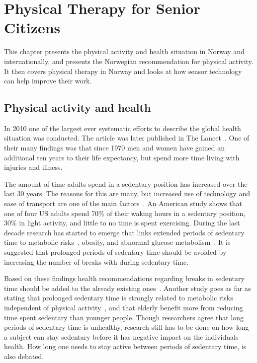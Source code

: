 \chapter{Physical Therapy for Senior Citizens}
This chapter presents the physical activity and health situation in Norway and internationally, and presents the Norwegian recommendation for physical activity. It then covers physical therapy in Norway and looks at how sensor technology can help improve their work.

\section{Physical activity and health}
In 2010 one of the largest ever systematic efforts to describe the global health situation was conducted. The article was later published in The Lancet~\cite{globalBurden}. One of their many findings was that since 1970 men and women have gained an additional ten years to their life expectancy, but spend more time living with injuries and illness. 

The amount of time adults spend in a sedentary position has increased over the last 30 years. The reasons for this are many, but increased use of technology and ease of transport are one of the main factors~\cite{sedentaryBehaviour}. An American study shows that one of four US adults spend 70\% of their waking hours in a sedentary position, 30\% in light activity, and little to no time is spent exercising. During the last decade research has started to emerge that links extended periods of sedentary time to metabolic risks~\cite{sedentaryTime}, obesity, and abnormal glucose metabolism~\cite{breaksSedentary}. It is suggested that prolonged periods of sedentary time should be avoided by increasing the number of breaks with during sedentary time. 

Based on these findings health recommendations regarding breaks in sedentary time should be added to the already existing ones~\cite{breaksSedentary}. Another study goes as far as stating that prolonged sedentary time is strongly related to metabolic risks independent of physical activity~\cite{sedentaryActivity}, and that elderly benefit more from reducing time spent sedentary than younger people. Though researchers agree that long periods of sedentary time is unhealthy, research still has to be done on how long a subject can stay sedentary before it has negative impact on the individuals health. How long one needs to stay active between periods of sedentary time, is also debated.

